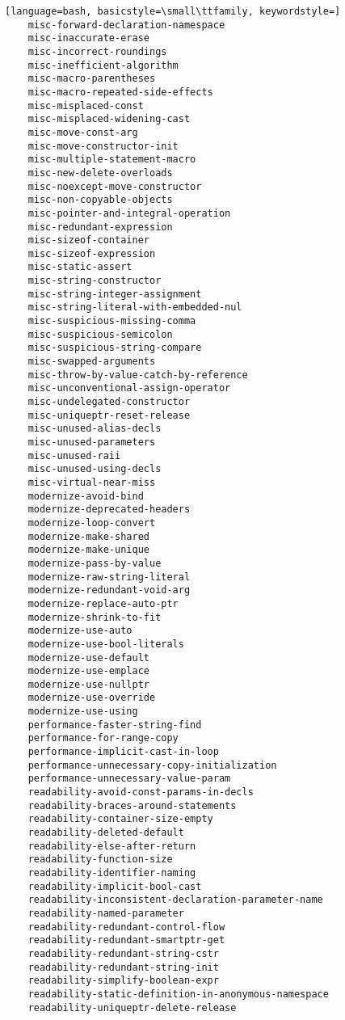\documentclass[aspectratio=169]{beamer}
\begin{document}
\begin{lstlisting}[language=bash, basicstyle=\small\ttfamily, keywordstyle=]
    misc-forward-declaration-namespace
    misc-inaccurate-erase
    misc-incorrect-roundings
    misc-inefficient-algorithm
    misc-macro-parentheses
    misc-macro-repeated-side-effects
    misc-misplaced-const
    misc-misplaced-widening-cast
    misc-move-const-arg
    misc-move-constructor-init
    misc-multiple-statement-macro
    misc-new-delete-overloads
    misc-noexcept-move-constructor
    misc-non-copyable-objects
    misc-pointer-and-integral-operation
    misc-redundant-expression
    misc-sizeof-container
    misc-sizeof-expression
    misc-static-assert
    misc-string-constructor
    misc-string-integer-assignment
    misc-string-literal-with-embedded-nul
    misc-suspicious-missing-comma
    misc-suspicious-semicolon
    misc-suspicious-string-compare
    misc-swapped-arguments
    misc-throw-by-value-catch-by-reference
    misc-unconventional-assign-operator
    misc-undelegated-constructor
    misc-uniqueptr-reset-release
    misc-unused-alias-decls
    misc-unused-parameters
    misc-unused-raii
    misc-unused-using-decls
    misc-virtual-near-miss
    modernize-avoid-bind
    modernize-deprecated-headers
    modernize-loop-convert
    modernize-make-shared
    modernize-make-unique
    modernize-pass-by-value
    modernize-raw-string-literal
    modernize-redundant-void-arg
    modernize-replace-auto-ptr
    modernize-shrink-to-fit
    modernize-use-auto
    modernize-use-bool-literals
    modernize-use-default
    modernize-use-emplace
    modernize-use-nullptr
    modernize-use-override
    modernize-use-using
    performance-faster-string-find
    performance-for-range-copy
    performance-implicit-cast-in-loop
    performance-unnecessary-copy-initialization
    performance-unnecessary-value-param
    readability-avoid-const-params-in-decls
    readability-braces-around-statements
    readability-container-size-empty
    readability-deleted-default
    readability-else-after-return
    readability-function-size
    readability-identifier-naming
    readability-implicit-bool-cast
    readability-inconsistent-declaration-parameter-name
    readability-named-parameter
    readability-redundant-control-flow
    readability-redundant-smartptr-get
    readability-redundant-string-cstr
    readability-redundant-string-init
    readability-simplify-boolean-expr
    readability-static-definition-in-anonymous-namespace
    readability-uniqueptr-delete-release
  \end{lstlisting}
\end{document}
